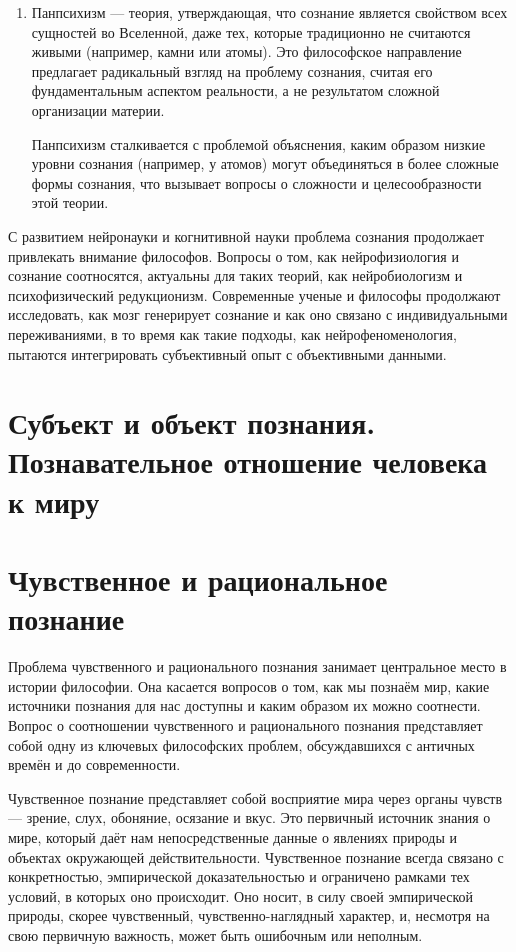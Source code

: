 \documentclass[12pt,a4paper]{article}
\begin{document}
\begin{enumerate}
		\item Панпсихизм — теория, утверждающая, что сознание является свойством всех сущностей во Вселенной, даже тех, которые традиционно не считаются живыми (например, камни или атомы). Это философское направление предлагает радикальный взгляд на проблему сознания, считая его фундаментальным аспектом реальности, а не результатом сложной организации материи.
		
		
		\par Панпсихизм сталкивается с проблемой объяснения, каким образом низкие уровни сознания (например, у атомов) могут объединяться в более сложные формы сознания, что вызывает вопросы о сложности и целесообразности этой теории.
	\end{enumerate}
	\par С развитием нейронауки и когнитивной науки проблема сознания продолжает привлекать внимание философов. Вопросы о том, как нейрофизиология и сознание соотносятся, актуальны для таких теорий, как нейробиологизм и психофизический редукционизм. Современные ученые и философы продолжают исследовать, как мозг генерирует сознание и как оно связано с индивидуальными переживаниями, в то время как такие подходы, как нейрофеноменология, пытаются интегрировать субъективный опыт с объективными данными.
	
	\section{Субъект и объект познания. Познавательное отношение человека к миру}
	
	\section{Чувственное и рациональное познание~\checkmark}
	Проблема чувственного и рационального познания занимает центральное место в истории философии. Она касается вопросов о том, как мы познаём мир, какие источники познания для нас доступны и каким образом их можно соотнести. Вопрос о соотношении чувственного и рационального познания представляет собой одну из ключевых философских проблем, обсуждавшихся с античных времён и до современности.
	
	Чувственное познание представляет собой восприятие мира через органы чувств — зрение, слух, обоняние, осязание и вкус. Это первичный источник знания о мире, который даёт нам непосредственные данные о явлениях природы и объектах окружающей действительности. Чувственное познание всегда связано с конкретностью, эмпирической доказательностью и ограничено рамками тех условий, в которых оно происходит. Оно носит, в силу своей эмпирической природы, скорее чувственный, чувственно-наглядный характер, и, несмотря на свою первичную важность, может быть ошибочным или неполным.
	
\end{document}
